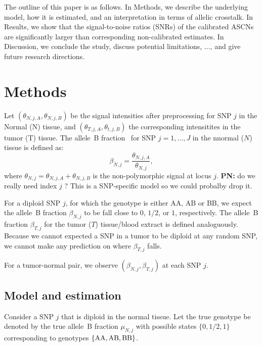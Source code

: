 \documentclass[10pt]{bmc_article}
\newenvironment{bmcformat}{\fussy\setboolean{publ}{true}}{\fussy}
\newcommand{\gAA}{\textnormal{AA}\xspace}
\newcommand{\gAB}{\textnormal{AB}\xspace}
\newcommand{\gBB}{\textnormal{BB}\xspace}
\newenvironment{PN}{\color{blue}\textbf{PN:}}{}
\begin{document}
\begin{bmcformat}
The outline of this paper is as follows. 
In Methods, we describe the underlying model, how it is estimated, and an interpretation in terms of allelic crosstalk.
In Results, we show that the signal-to-noise ratios (SNRs) of the calibrated ASCNs are significantly larger than corresponding non-calibrated estimates.
In Discussion, we conclude the study, discuss potential limitations, ..., and give future research directions.


 
\section*{Methods}
Let $(\theta_{N,j,A}, \theta_{N,j,B})$ be the signal intensities after preprocessing for SNP $j$ in the Normal (N) tissue, and $(\theta_{T,j,A}, \theta_{t,j,B})$ the corresponding intensitites in the tumor (T) tissue. The allele~B fraction~\cite{PeifferD_etal_2006} for SNP $j=1,\ldots,J$ in the nnormal ($N$) tissue is defined as:
\begin{equation}
  \beta_{N,j} = \frac{\theta_{N,j,A}}{\theta_{N,j}},
  \label{eqnCnLogRatio}
\end{equation}
where $\theta_{N,j} = \theta_{N,j,A} + \theta_{N,j,B}$ is the non-polymorphic signal at locus $j$.
\begin{PN}
do we really need index $j$ ? This is a SNP-specific model so we could probalby drop it.
\end{PN}

For a diploid SNP $j$, for which the genotype is either AA, AB or BB, we expect the allele~B fraction $\beta_{N,j}$ to be fall close to $0$, $1/2$, or $1$, respectively.
The allele~B fraction $\beta_{T,j}$ for the tumor ($T$) tissue/blood extract is defined analoguously. Because we cannot expected a SNP in a tumor to be diploid at any random SNP, we cannot make any prediction on where $\beta_{T,j}$ falls.

For a tumor-normal pair, we observe $(\beta_{N,j}, \beta_{T,j})$ at each SNP $j$.

\subsection*{Model and estimation}
Consider a SNP $j$ that is diploid in the normal tissue.  
Let the true genotype be denoted by the true allele~B fraction $\mu_{N,j}$ with possible states $\{0,1/2,1\}$ corresponding to genotypes $\{\gAA,\gAB,\gBB\}$.


\end{bmcformat}
\end{document}
